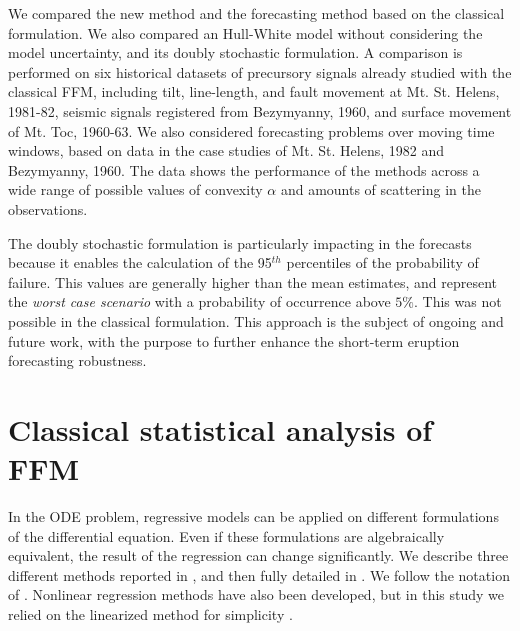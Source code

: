 \documentclass{article}
\begin{document}
We compared the new method and the forecasting method based on the classical formulation. We also compared an Hull-White model without considering the model uncertainty, and its doubly stochastic formulation. A comparison is performed on six historical datasets of precursory signals already studied with the classical FFM, including tilt, line-length, and fault movement at Mt. St. Helens, 1981-82, seismic signals registered from Bezymyanny, 1960, and surface movement of Mt. Toc, 1960-63. We also considered forecasting problems over moving time windows, based on data in the case studies of Mt. St. Helens, 1982 and Bezymyanny, 1960. The data shows the performance of the methods across a wide range of possible values of convexity $\alpha$ and amounts of scattering in the observations.

The doubly stochastic formulation is particularly impacting in the forecasts because it enables the calculation of the 95$^{th}$ percentiles of the probability of failure. This values are generally higher than the mean estimates, and represent the \emph{worst case scenario} with a probability of occurrence above $5\%$. This was not possible in the classical formulation. This approach is the subject of ongoing and future work, with the purpose to further enhance the short-term eruption forecasting robustness.
\newpage
\appendix
\section{Classical statistical analysis of FFM}\label{A-1}
In the ODE problem, regressive models can be applied on different formulations of the differential equation. Even if these formulations are algebraically equivalent, the result of the regression can change significantly. We describe three different methods reported in \cite{Voight1988}, and then fully detailed in \cite{Cornelius1995}. We follow the notation of \cite{Cornelius1995}. Nonlinear regression methods have also been developed, but in this study we relied on the linearized method for simplicity \citep{Bell2011}.
\end{document}
